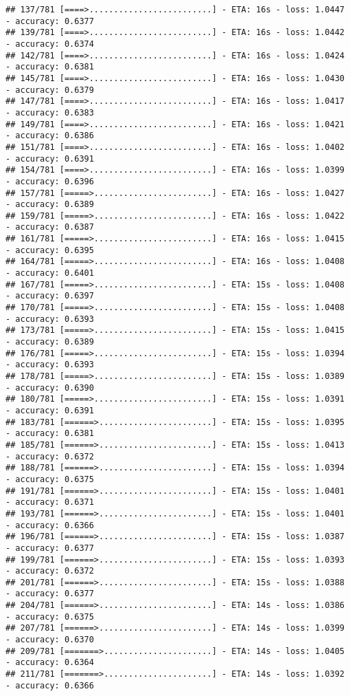 \documentclass[
]{article}
\begin{document}
\begin{verbatim}
## 137/781 [====>.........................] - ETA: 16s - loss: 1.0447 - accuracy: 0.6377
## 139/781 [====>.........................] - ETA: 16s - loss: 1.0442 - accuracy: 0.6374
## 142/781 [====>.........................] - ETA: 16s - loss: 1.0424 - accuracy: 0.6381
## 145/781 [====>.........................] - ETA: 16s - loss: 1.0430 - accuracy: 0.6379
## 147/781 [====>.........................] - ETA: 16s - loss: 1.0417 - accuracy: 0.6383
## 149/781 [====>.........................] - ETA: 16s - loss: 1.0421 - accuracy: 0.6386
## 151/781 [====>.........................] - ETA: 16s - loss: 1.0402 - accuracy: 0.6391
## 154/781 [====>.........................] - ETA: 16s - loss: 1.0399 - accuracy: 0.6396
## 157/781 [=====>........................] - ETA: 16s - loss: 1.0427 - accuracy: 0.6389
## 159/781 [=====>........................] - ETA: 16s - loss: 1.0422 - accuracy: 0.6387
## 161/781 [=====>........................] - ETA: 16s - loss: 1.0415 - accuracy: 0.6395
## 164/781 [=====>........................] - ETA: 16s - loss: 1.0408 - accuracy: 0.6401
## 167/781 [=====>........................] - ETA: 15s - loss: 1.0408 - accuracy: 0.6397
## 170/781 [=====>........................] - ETA: 15s - loss: 1.0408 - accuracy: 0.6393
## 173/781 [=====>........................] - ETA: 15s - loss: 1.0415 - accuracy: 0.6389
## 176/781 [=====>........................] - ETA: 15s - loss: 1.0394 - accuracy: 0.6393
## 178/781 [=====>........................] - ETA: 15s - loss: 1.0389 - accuracy: 0.6390
## 180/781 [=====>........................] - ETA: 15s - loss: 1.0391 - accuracy: 0.6391
## 183/781 [======>.......................] - ETA: 15s - loss: 1.0395 - accuracy: 0.6381
## 185/781 [======>.......................] - ETA: 15s - loss: 1.0413 - accuracy: 0.6372
## 188/781 [======>.......................] - ETA: 15s - loss: 1.0394 - accuracy: 0.6375
## 191/781 [======>.......................] - ETA: 15s - loss: 1.0401 - accuracy: 0.6371
## 193/781 [======>.......................] - ETA: 15s - loss: 1.0401 - accuracy: 0.6366
## 196/781 [======>.......................] - ETA: 15s - loss: 1.0387 - accuracy: 0.6377
## 199/781 [======>.......................] - ETA: 15s - loss: 1.0393 - accuracy: 0.6372
## 201/781 [======>.......................] - ETA: 15s - loss: 1.0388 - accuracy: 0.6377
## 204/781 [======>.......................] - ETA: 14s - loss: 1.0386 - accuracy: 0.6375
## 207/781 [======>.......................] - ETA: 14s - loss: 1.0399 - accuracy: 0.6370
## 209/781 [=======>......................] - ETA: 14s - loss: 1.0405 - accuracy: 0.6364
## 211/781 [=======>......................] - ETA: 14s - loss: 1.0392 - accuracy: 0.6366

\end{verbatim}
\end{document}
